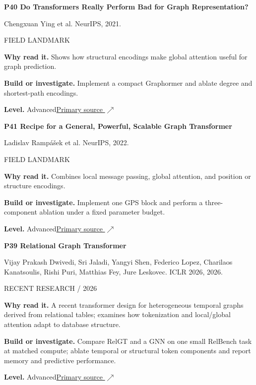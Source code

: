 \documentclass[11pt,letterpaper]{article}
\begin{document}
\begin{minipage}{\linewidth}
{\large\bfseries P40 Do Transformers Really Perform Bad for Graph Representation?}\par
Chengxuan Ying et al. NeurIPS, 2021.\par
\textcolor{ink}{\small FIELD LANDMARK}\par
\textbf{Why read it.} Shows how structural encodings make global attention useful for graph prediction.\par
\textbf{Build or investigate.} Implement a compact Graphormer and ablate degree and shortest-path encodings.\par
\textbf{Level.} Advanced\quad\href{https://arxiv.org/abs/2106.05234}{Primary source $\nearrow$}\par
\end{minipage}\par\vspace{10pt}
\begin{minipage}{\linewidth}
{\large\bfseries P41 Recipe for a General, Powerful, Scalable Graph Transformer}\par
Ladislav Ramp\'ašek et al. NeurIPS, 2022.\par
\textcolor{ink}{\small FIELD LANDMARK}\par
\textbf{Why read it.} Combines local message passing, global attention, and position or structure encodings.\par
\textbf{Build or investigate.} Implement one GPS block and perform a three-component ablation under a fixed parameter budget.\par
\textbf{Level.} Advanced\quad\href{https://arxiv.org/abs/2205.12454}{Primary source $\nearrow$}\par
\end{minipage}\par\vspace{10pt}
\begin{minipage}{\linewidth}
{\large\bfseries P39 Relational Graph Transformer}\par
Vijay Prakash Dwivedi, Sri Jaladi, Yangyi Shen, Federico Lopez, Charilaos Kanatsoulis, Rishi Puri, Matthias Fey, Jure Leskovec. ICLR 2026, 2026.\par
\textcolor{ink}{\small RECENT RESEARCH / 2026}\par
\textbf{Why read it.} A recent transformer design for heterogeneous temporal graphs derived from relational tables; examines how tokenization and local/global attention adapt to database structure.\par
\textbf{Build or investigate.} Compare RelGT and a GNN on one small RelBench task at matched compute; ablate temporal or structural token components and report memory and predictive performance.\par
\textbf{Level.} Advanced\quad\href{https://proceedings.iclr.cc/paper_files/paper/2026/hash/fa1ef43326cfb8a808c0649708187f2a-Abstract-Conference.html}{Primary source $\nearrow$}\par
\end{minipage}\par\vspace{10pt}
\end{document}

